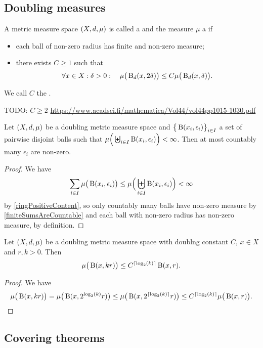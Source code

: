 \subsection{Doubling measures}
\begin{definition}
A metric measure space $\sSet{X,d,\mu}$ is called a  and the measure $\mu$ a  if
\begin{itemize}
\item each ball of non-zero radius has finite and non-zero measure;
\item there exists $C\geq 1$ such that
\[ \forall x\in X: \delta >0:\quad \mu\big(\operatorname{B}_d(x, 2\delta)\big) \leq C \mu\big(\operatorname{B}_d(x, \delta)\big). \]
\end{itemize}
We call $C$ the .
\end{definition}
TODO: $C\geq 2$ \url{https://www.acadsci.fi/mathematica/Vol44/vol44pp1015-1030.pdf}

\begin{lemma} \label{doublingMeasureFiniteMeasureOfBallsImpliesCountableCollection}
Let $\sSet{X,d,\mu}$ be a doubling metric measure space and $\big\{\operatorname{B}(x_i, \epsilon_i)\big\}_{i\in I}$ a set of pairwise disjoint balls such that $\mu\Big(\biguplus_{i\in I}\operatorname{B}(x_i, \epsilon_i)\Big) < \infty$. Then at most countably many $\epsilon_i$ are non-zero.
\end{lemma}
\begin{proof}
We have
\[ \sum_{i\in I}\mu\big(\operatorname{B}(x_i, \epsilon_i)\big) \leq \mu\Big(\biguplus_{i\in I}\operatorname{B}(x_i, \epsilon_i)\Big) < \infty \]
by \ref{ringPositiveContent}, so only countably many balls have non-zero measure by \ref{finiteSumsAreCountable} and each ball with non-zero radius has non-zero measure, by definition.
\end{proof}

\begin{lemma}
Let $\sSet{X,d,\mu}$ be a doubling metric measure space with doublng constant $C$, $x\in X$ and $r,k>0$. Then
\[ \mu\big(\operatorname{B}(x,kr)\big) \leq C^{\lceil\log_2(k)\rceil}\operatorname{B}(x,r). \]
\end{lemma}
\begin{proof}
We have
\[ \mu\big(\operatorname{B}(x,kr)\big) = \mu\big(\operatorname{B}(x,2^{\log_2(k)}r)\big) \leq \mu\big(\operatorname{B}(x,2^{\lceil\log_2(k)\rceil}r)\big) \leq C^{\lceil\log_2(k)\rceil}\mu\big(\operatorname{B}(x,r)\big). \]
\end{proof}

\subsection{Covering theorems}
